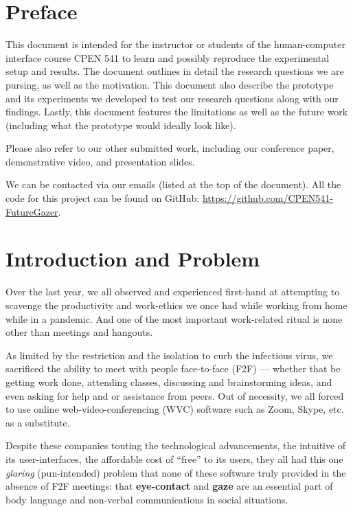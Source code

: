 \documentclass[11pt,letterpaper]{article}
\begin{document}


\section*{Preface}

This document is intended for the instructor or students of the human-computer interface course CPEN 541 to learn and possibly reproduce the experimental setup and results. The document outlines in detail the research questions we are pursing, as well as the motivation. This document also describe the prototype and its experiments we developed to test our research questions along with our findings. Lastly, this document features the limitations as well as the future work (including what the prototype would ideally look like). 

Please also refer to our other submitted work, including our conference paper, demonstrative video, and presentation slides.

We can be contacted via our emails (listed at the top of the document). All the code for this project can be found on GitHub: \url{https://github.com/CPEN541-FutureGazer}.

\clearpage

\section{Introduction and Problem}

Over the last year, we all observed and experienced first-hand at attempting to scavenge the productivity and work-ethics we once had while working from home while in a pandemic. And one of the most important work-related ritual is none other than meetings and hangouts. 

As limited by the restriction and the isolation to curb the infectious virus, we sacrificed the ability to meet with people face-to-face (F2F) --- whether that be getting work done, attending classes, discussing and brainstorming ideas, and even asking for help and or assistance from peers. Out of necessity, we all forced to use online web-video-conferencing (WVC) software such as Zoom, Skype, etc. as a substitute.

Despite these companies touting the technological advancements, the intuitive of its user-interfaces, the affordable cost of “free” to its users, they all had this one \textit{glaring} (pun-intended) problem that none of these software truly provided in the absence of F2F meetings: that \textbf{eye-contact} and \textbf{gaze} are an essential part of body language and non-verbal communications in social situations. 
\end{document}
